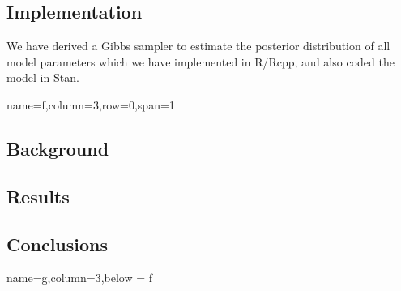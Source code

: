 \documentclass[landscape,a0paper,fontscale=0.35]{baposter}
\begin{document}
\begin{poster}
{\subsection*{Implementation}
We have derived a Gibbs sampler to estimate the posterior distribution of all model parameters which we have implemented in R/Rcpp, and also coded the model in Stan.

}

 {name=f,column=3,row=0,span=1}{
\subsection*{Background}
\subsection*{Results}
\subsection*{Conclusions}
}


 {name=g,column=3,below = f}{




}

\end{poster}
\end{document}
